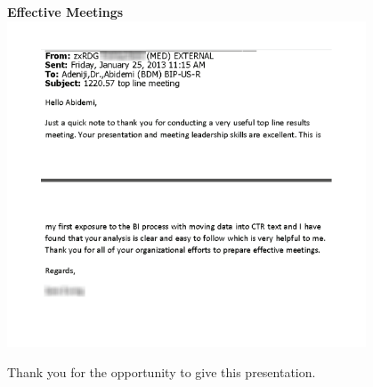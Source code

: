\documentclass{beamer}
\begin{document}
\begin{frame}
	\frame{\frametitle{ }}
	\center
	\textbf{Effective Meetings}\\
		\includegraphics[width=0.80\textwidth]{effectiveness}
\end{frame}

\begin{frame}
	\center
	Thank you for the opportunity to give this presentation.
\end{frame}
\end{document}
